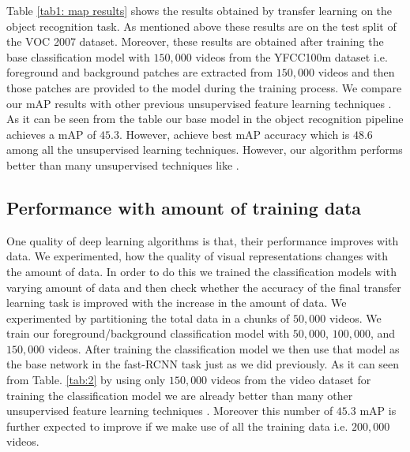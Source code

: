 \documentclass[10pt,twocolumn,letterpaper]{article}
\begin{document}
Table \ref{tab1: map results} shows the results obtained by transfer learning on the object recognition task. As mentioned above these results are on the test split of the VOC 2007 dataset. Moreover, these results are obtained after training the base classification model with $150,000$ videos from the YFCC100m dataset i.e. foreground and background patches are extracted from $150,000$ videos and then those patches are provided to the model during the training process. We compare our mAP results with other previous unsupervised feature learning techniques \cite{doersch2015unsupervised, pathak2017learning, gao2016object, wang2015unsupervised, agrawal2015learning, pathak2016context, owens2016ambient, donahue2016adversarial}. As it can be seen from the table our base model in the object recognition pipeline achieves a mAP of $45.3$. However, \cite{pathak2017learning} achieve best mAP accuracy which is $48.6$ among all the unsupervised learning techniques. However, our algorithm performs better than many unsupervised techniques like \cite{wang2015unsupervised, agrawal2015learning, pathak2016context, owens2016ambient, donahue2016adversarial}. 




\subsection{Performance with amount of training data}
One quality of deep learning algorithms is that, their performance improves with data. We experimented, how the quality of visual representations changes with the amount of data. In order to do this we trained the classification models with varying amount of data and then check whether the accuracy of the final transfer learning task is improved with the increase in the amount of data. We experimented by partitioning the total data in a chunks of $50,000$ videos. We train our foreground/background classification model with $50,000$, $100,000$, and $150,000$ videos. After training the classification model we then use that model as the base network in the fast-RCNN task just as we did previously. As it can seen from Table. \ref{tab:2} by using only $150,000$ videos from the video dataset for training the classification model we are already better than many other unsupervised feature learning techniques \cite{wang2015unsupervised, agrawal2015learning, pathak2016context, owens2016ambient, donahue2016adversarial}. Moreover this number of $45.3$ mAP is further expected to improve if we make use of all the training data i.e. $200,000$ videos. 
\end{document}
